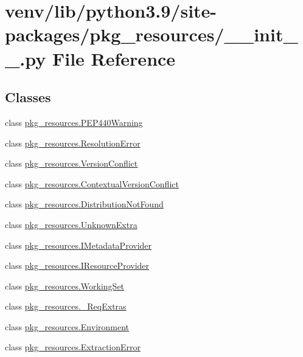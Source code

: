 \hypertarget{venv_2lib_2python3_89_2site-packages_2pkg__resources_2____init_____8py}{}\section{venv/lib/python3.9/site-\/packages/pkg\+\_\+resources/\+\_\+\+\_\+init\+\_\+\+\_\+.py File Reference}
\label{venv_2lib_2python3_89_2site-packages_2pkg__resources_2____init_____8py}
\subsection*{Classes}
\begin{DoxyCompactItemize}
\item 
class \hyperlink{classpkg__resources_1_1PEP440Warning}{pkg\+\_\+resources.\+P\+E\+P440\+Warning}
\item 
class \hyperlink{classpkg__resources_1_1ResolutionError}{pkg\+\_\+resources.\+Resolution\+Error}
\item 
class \hyperlink{classpkg__resources_1_1VersionConflict}{pkg\+\_\+resources.\+Version\+Conflict}
\item 
class \hyperlink{classpkg__resources_1_1ContextualVersionConflict}{pkg\+\_\+resources.\+Contextual\+Version\+Conflict}
\item 
class \hyperlink{classpkg__resources_1_1DistributionNotFound}{pkg\+\_\+resources.\+Distribution\+Not\+Found}
\item 
class \hyperlink{classpkg__resources_1_1UnknownExtra}{pkg\+\_\+resources.\+Unknown\+Extra}
\item 
class \hyperlink{classpkg__resources_1_1IMetadataProvider}{pkg\+\_\+resources.\+I\+Metadata\+Provider}
\item 
class \hyperlink{classpkg__resources_1_1IResourceProvider}{pkg\+\_\+resources.\+I\+Resource\+Provider}
\item 
class \hyperlink{classpkg__resources_1_1WorkingSet}{pkg\+\_\+resources.\+Working\+Set}
\item 
class \hyperlink{classpkg__resources_1_1__ReqExtras}{pkg\+\_\+resources.\+\_\+\+Req\+Extras}
\item 
class \hyperlink{classpkg__resources_1_1Environment}{pkg\+\_\+resources.\+Environment}
\item 
class \hyperlink{classpkg__resources_1_1ExtractionError}{pkg\+\_\+resources.\+Extraction\+Error}

\end{DoxyCompactItemize}
